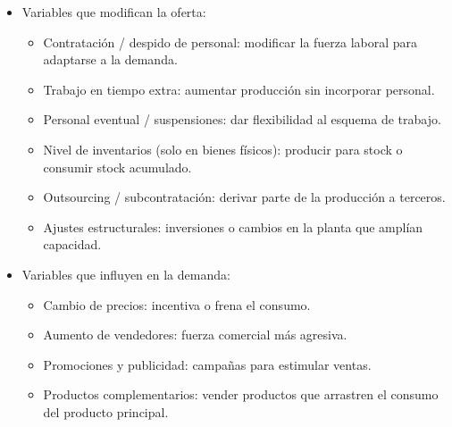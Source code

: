 \documentclass[a4paper,oneside,11pt]{article}
\begin{document}
\begin{itemize}
    \item Variables que modifican la oferta:
    \begin{itemize}
        \item Contratación / despido de personal: modificar la fuerza laboral para adaptarse a la demanda.
        \item Trabajo en tiempo extra: aumentar producción sin incorporar personal.
        \item Personal eventual / suspensiones: dar flexibilidad al esquema de trabajo.
        \item Nivel de inventarios (solo en bienes físicos): producir para stock o consumir stock acumulado.
        \item Outsourcing / subcontratación: derivar parte de la producción a terceros.
        \item Ajustes estructurales: inversiones o cambios en la planta que amplían capacidad.
    \end{itemize}
    
    \item Variables que influyen en la demanda:
    \begin{itemize}
        \item Cambio de precios: incentiva o frena el consumo.
        \item Aumento de vendedores: fuerza comercial más agresiva.
        \item Promociones y publicidad: campañas para estimular ventas.
        \item Productos complementarios: vender productos que arrastren el consumo del producto principal.
    \end{itemize}
\end{itemize}

\end{document}
